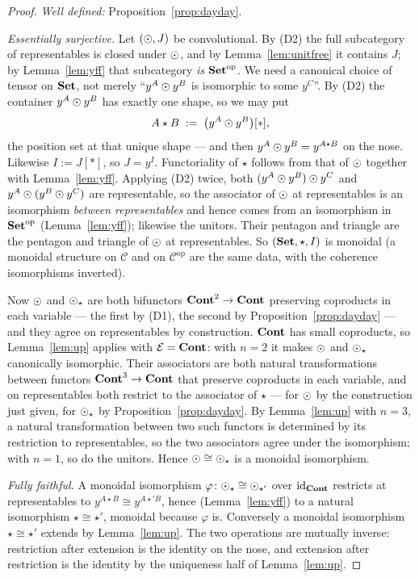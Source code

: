 \begin{proof}
\emph{Well defined:} Proposition~\ref{prop:dayday}.

\emph{Essentially surjective.} Let $(\mathbin{\odot},J)$ be convolutional. By (D2) the
full subcategory of representables is closed under $\mathbin{\odot}$, and by
Lemma~\ref{lem:unitfree} it contains $J$; by Lemma~\ref{lem:yff} that
subcategory \emph{is} $\mathbf{Set}^{\mathrm{op}}$. We need a canonical choice of tensor
on $\mathbf{Set}$, not merely ``$y^A\mathbin{\odot} y^B$ is isomorphic to some $y^C$''. By (D2)
the container $y^A\mathbin{\odot} y^B$ has exactly one shape, so we may put
\[
   A\star B \;:=\;\bigl(y^A\mathbin{\odot} y^B\bigr)[\ast],
\]
the position set at that unique shape --- and then $y^A\mathbin{\odot} y^B=y^{A\star B}$
on the nose. Likewise $I:=J[\ast]$, so $J=y^I$. Functoriality of $\star$ follows
from that of $\mathbin{\odot}$ together with Lemma~\ref{lem:yff}. Applying (D2) twice,
both $(y^A\mathbin{\odot} y^B)\mathbin{\odot} y^C$ and $y^A\mathbin{\odot}(y^B\mathbin{\odot} y^C)$ are representable, so
the associator of $\mathbin{\odot}$ at representables is an isomorphism \emph{between
representables} and hence comes from an isomorphism in $\mathbf{Set}^{\mathrm{op}}$
(Lemma~\ref{lem:yff}); likewise the unitors. Their pentagon and triangle are the
pentagon and triangle of $\mathbin{\odot}$ at representables. So $(\mathbf{Set},\star,I)$ is
monoidal (a monoidal structure on $\mathcal C$ and on $\mathcal C^{\mathrm{op}}$
are the same data, with the coherence isomorphisms inverted).

Now $\mathbin{\odot}$ and $\mathbin{\odot}_\star$ are both bifunctors $\mathbf{Cont}^2\to\mathbf{Cont}$ preserving
coproducts in each variable --- the first by (D1), the second by
Proposition~\ref{prop:dayday} --- and they agree on representables by
construction. $\mathbf{Cont}$ has small coproducts, so Lemma~\ref{lem:up} applies with
$\mathcal E=\mathbf{Cont}$: with $n=2$ it makes $\mathbin{\odot}$ and $\mathbin{\odot}_\star$ canonically
isomorphic. Their associators are both natural transformations between functors
$\mathbf{Cont}^3\to\mathbf{Cont}$ that preserve coproducts in each variable, and on
representables both restrict to the associator of $\star$ --- for $\mathbin{\odot}$ by the
construction just given, for $\mathbin{\odot}_\star$ by Proposition~\ref{prop:dayday}. By
Lemma~\ref{lem:up} with $n=3$, a natural transformation between two such
functors is determined by its restriction to representables, so the two
associators agree under the isomorphism; with $n=1$, so do the unitors. Hence
$\mathbin{\odot}\cong\mathbin{\odot}_\star$ is a monoidal isomorphism.

\emph{Fully faithful.} A monoidal isomorphism $\varphi\colon\mathbin{\odot}_\star\cong
\mathbin{\odot}_{\star'}$ over $\mathrm{id}_{\mathbf{Cont}}$ restricts at representables to
$y^{A\star B}\cong y^{A\star' B}$, hence (Lemma~\ref{lem:yff}) to a natural
isomorphism $\star\cong\star'$, monoidal because $\varphi$ is. Conversely a
monoidal isomorphism $\star\cong\star'$ extends by Lemma~\ref{lem:up}. The two
operations are mutually inverse: restriction after extension is the identity on
the nose, and extension after restriction is the identity by the uniqueness half
of Lemma~\ref{lem:up}.
\end{proof}

